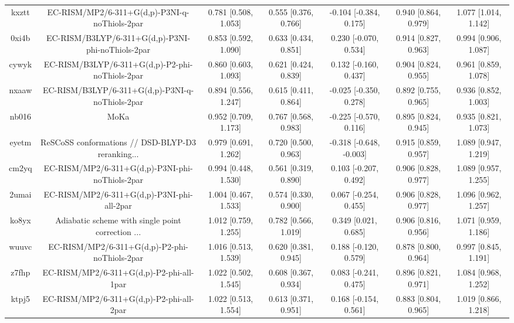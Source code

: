 \documentclass{article}
\begin{document}
\begin{center}
\begin{longtable}{|ccccccc|}
 kxztt &      EC-RISM/MP2/6-311+G(d,p)-P3NI-q-noThiols-2par &  0.781 [0.508, 1.053] &  0.555 [0.376, 0.766] &   -0.104 [-0.384, 0.175] &  0.940 [0.864, 0.979] &   1.077 [1.014, 1.142] \\
 0xi4b &  EC-RISM/B3LYP/6-311+G(d,p)-P3NI-phi-noThiols-2par &  0.853 [0.592, 1.090] &  0.633 [0.434, 0.851] &    0.230 [-0.070, 0.534] &  0.914 [0.827, 0.963] &   0.994 [0.906, 1.087] \\
 cywyk &    EC-RISM/B3LYP/6-311+G(d,p)-P2-phi-noThiols-2par &  0.860 [0.603, 1.093] &  0.621 [0.424, 0.839] &    0.132 [-0.160, 0.437] &  0.904 [0.824, 0.955] &   0.961 [0.859, 1.078] \\
 nxaaw &    EC-RISM/B3LYP/6-311+G(d,p)-P3NI-q-noThiols-2par &  0.894 [0.556, 1.247] &  0.615 [0.411, 0.864] &   -0.025 [-0.350, 0.278] &  0.892 [0.755, 0.965] &   0.936 [0.852, 1.003] \\
 nb016 &                                               MoKa &  0.952 [0.709, 1.173] &  0.767 [0.568, 0.983] &   -0.225 [-0.570, 0.116] &  0.895 [0.824, 0.945] &   0.935 [0.821, 1.073] \\
 eyetm &  ReSCoSS conformations // DSD-BLYP-D3 reranking... &  0.979 [0.691, 1.262] &  0.720 [0.500, 0.963] &  -0.318 [-0.648, -0.003] &  0.915 [0.859, 0.957] &   1.089 [0.947, 1.219] \\
 cm2yq &    EC-RISM/MP2/6-311+G(d,p)-P3NI-phi-noThiols-2par &  0.994 [0.448, 1.530] &  0.561 [0.319, 0.890] &    0.103 [-0.207, 0.492] &  0.906 [0.828, 0.977] &   1.089 [0.957, 1.255] \\
 2umai &         EC-RISM/MP2/6-311+G(d,p)-P3NI-phi-all-2par &  1.004 [0.467, 1.533] &  0.574 [0.330, 0.900] &    0.067 [-0.254, 0.455] &  0.906 [0.828, 0.977] &   1.096 [0.962, 1.257] \\
 ko8yx &  Adiabatic scheme with single point correction ... &  1.012 [0.759, 1.255] &  0.782 [0.566, 1.019] &     0.349 [0.021, 0.685] &  0.906 [0.816, 0.956] &   1.071 [0.959, 1.186] \\
 wuuvc &      EC-RISM/MP2/6-311+G(d,p)-P2-phi-noThiols-2par &  1.016 [0.513, 1.539] &  0.620 [0.381, 0.945] &    0.188 [-0.120, 0.579] &  0.878 [0.800, 0.964] &   0.997 [0.845, 1.191] \\
 z7fhp &           EC-RISM/MP2/6-311+G(d,p)-P2-phi-all-1par &  1.022 [0.502, 1.545] &  0.608 [0.367, 0.934] &    0.083 [-0.241, 0.475] &  0.896 [0.821, 0.971] &   1.084 [0.968, 1.252] \\
 ktpj5 &           EC-RISM/MP2/6-311+G(d,p)-P2-phi-all-2par &  1.022 [0.513, 1.554] &  0.613 [0.371, 0.951] &    0.168 [-0.154, 0.561] &  0.883 [0.804, 0.965] &   1.019 [0.866, 1.218] \\

\end{longtable}
\end{center}
\end{document}
